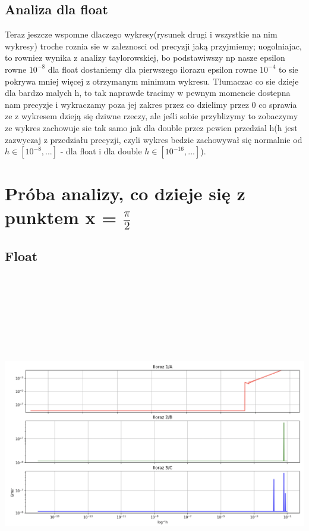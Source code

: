 \documentclass[12pt]{article}
\begin{document}
\subsection{Analiza dla float}
Teraz jeszcze wspomne dlaczego wykresy(rysunek drugi i wszystkie na nim wykresy) troche roznia sie w zaleznosci od precyzji jaką przyjmiemy; uogolniajac, to rowniez wynika z analizy taylorowskiej, bo podstawiwszy np nasze epsilon rowne $10^{-8}$ dla float dostaniemy dla pierwszego ilorazu epsilon rowne $10^{-4}$ to sie pokrywa mniej więcej z otrzymanym minimum wykresu. Tłumaczac co sie dzieje dla bardzo malych h, to tak naprawde tracimy w pewnym momencie dostepna nam precyzje i wykraczamy poza jej zakres przez co dzielimy przez 0 co sprawia ze z wykresem dzieją się dziwne rzeczy, ale jeśli sobie przyblizymy to zobaczymy ze wykres zachowuje sie tak samo jak dla double przez pewien przedzial h(h jest zazwyczaj z przedziału precyzji, czyli wykres bedzie zachowywał się normalnie od $h \in [10^{-8} , ...]$ - dla float i dla double $h \in [10^{-16} , ...]$).
\newline
\newline
\section{Próba analizy, co dzieje się z punktem x = $\frac{\pi}{2}$}
\subsection*{Float}
\includegraphics[width=15cm,height=15cm, keepaspectratio]{wykres_float_pi}
\end{document}
